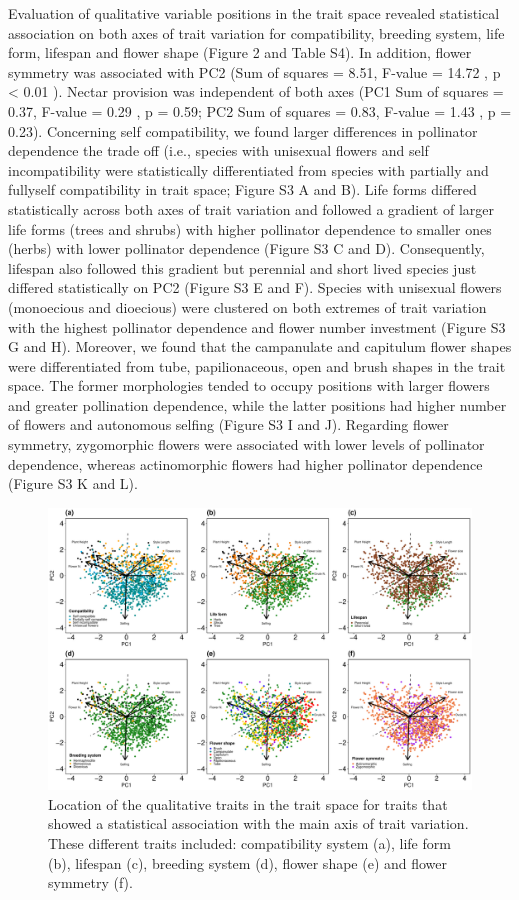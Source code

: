 \documentclass[12pt,a4paper,]{article}
\begin{document}
Evaluation of qualitative variable positions in the trait space revealed
statistical association on both axes of trait variation for
compatibility, breeding system, life form, lifespan and flower shape
(Figure 2 and Table S4). In addition, flower symmetry was associated
with PC2 (Sum of squares = 8.51, F-value = 14.72 , p \textless{} 0.01 ).
Nectar provision was independent of both axes (PC1 Sum of squares =
0.37, F-value = 0.29 , p = 0.59; PC2 Sum of squares = 0.83, F-value =
1.43 , p = 0.23). Concerning self compatibility, we found larger
differences in pollinator dependence the trade off (i.e., species with
unisexual flowers and self incompatibility were statistically
differentiated from species with partially and fullyself compatibility
in trait space; Figure S3 A and B). Life forms differed statistically
across both axes of trait variation and followed a gradient of larger
life forms (trees and shrubs) with higher pollinator dependence to
smaller ones (herbs) with lower pollinator dependence (Figure S3 C and
D). Consequently, lifespan also followed this gradient but perennial and
short lived species just differed statistically on PC2 (Figure S3 E and
F). Species with unisexual flowers (monoecious and dioecious) were
clustered on both extremes of trait variation with the highest
pollinator dependence and flower number investment (Figure S3 G and H).
Moreover, we found that the campanulate and capitulum flower shapes were
differentiated from tube, papilionaceous, open and brush shapes in the
trait space. The former morphologies tended to occupy positions with
larger flowers and greater pollination dependence, while the latter
positions had higher number of flowers and autonomous selfing (Figure S3
I and J). Regarding flower symmetry, zygomorphic flowers were associated
with lower levels of pollinator dependence, whereas actinomorphic
flowers had higher pollinator dependence (Figure S3 K and L).

\begin{figure}
\centering
\includegraphics{output/figures/unnamed-chunk-6-1.pdf}
\caption{\label{fig:unnamed-chunk-6}Location of the qualitative traits in
the trait space for traits that showed a statistical association with
the main axis of trait variation. These different traits included:
compatibility system (a), life form (b), lifespan (c), breeding system
(d), flower shape (e) and flower symmetry (f).}
\end{figure}
\end{document}
